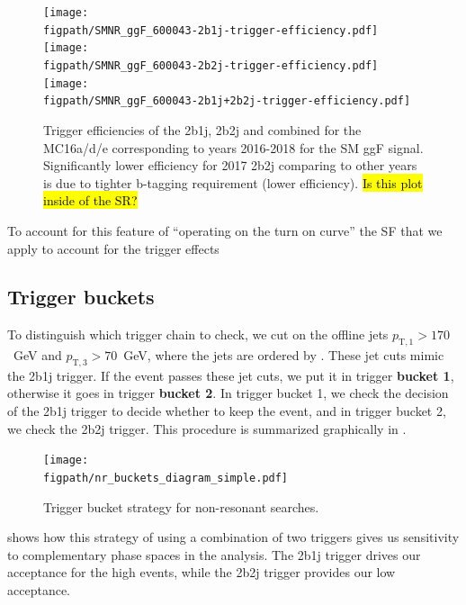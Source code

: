 \begin{figure}[htb]
        \centering
                \texttt{[image: \\figpath/SMNR\_ggF\_600043-2b1j-trigger-efficiency.pdf]}
                \texttt{[image: \\figpath/SMNR\_ggF\_600043-2b2j-trigger-efficiency.pdf]}
                \texttt{[image: \\figpath/SMNR\_ggF\_600043-2b1j+2b2j-trigger-efficiency.pdf]}
        \caption{Trigger efficiencies of the 2b1j, 2b2j and combined for the MC16a/d/e corresponding to years 2016-2018 for the SM ggF  signal.
        Significantly lower efficiency for 2017 2b2j comparing to other years is due to tighter b-tagging requirement (lower efficiency). \hl{Is this plot inside of the SR?}}
	\label{fig:HH_trigger_eff}
\end{figure}

To account for this feature of ``operating on the turn on curve'' the SF that we apply to account for the trigger effects 

\subsection{Trigger buckets}

To distinguish which trigger chain to check, we cut on the offline jets $p_{\text{T},1} > 170$~GeV and $p_{\text{T},3} > 70$~GeV, where the jets are ordered by \pt.
These jet \pt cuts mimic the 2b1j trigger.
If the event passes these jet cuts, we put it in trigger \textbf{bucket 1}, otherwise it goes in trigger \textbf{bucket 2}.
In trigger bucket 1, we check the decision of the 2b1j trigger to decide whether to keep the event, and in trigger bucket 2, we check the 2b2j trigger. This procedure is summarized graphically in \Fig{\ref{fig:trigger-bucket-strategy}}.

\begin{figure}[htbp]
    \centering
    \texttt{[image: \\figpath/nr\_buckets\_diagram\_simple.pdf]}
    \caption{Trigger bucket strategy for non-resonant searches.}
    \label{fig:trigger-bucket-strategy}
\end{figure}

\Fig{\ref{fig:trig-bucket-4b}} shows how this strategy of using a combination of two triggers gives us sensitivity to complementary phase spaces in the analysis. The 2b1j trigger drives our acceptance for the high \mhh events, while the 2b2j trigger provides our low \mhh acceptance.

